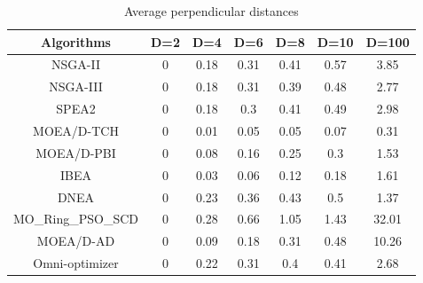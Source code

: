 \documentclass[conference]{IEEEtran}
\begin{document}
\begin{table}[htbp]
\centering
\caption{Average perpendicular distances}
\begin{tabular}{@{}ccccccc@{}}
\toprule
Algorithms         & D=2 & D=4                           & D=6                           & D=8                           & D=10                          & D=100                         \\ \midrule
NSGA-II            & 0  & 0.18                         & 0.31                         & 0.41                         & 0.57                         & 3.85                         \\
NSGA-III           & 0  & 0.18                         & 0.31                         & 0.39                         & 0.48                         & 2.77                         \\
SPEA2              & 0  & 0.18                         & 0.3                          & 0.41                         & 0.49                         & 2.98                         \\
MOEA/D-TCH         & 0  & \cellcolor[HTML]{F8FF00}0.01 & \cellcolor[HTML]{F8FF00}0.05 & \cellcolor[HTML]{F8FF00}0.05 & \cellcolor[HTML]{F8FF00}0.07 & \cellcolor[HTML]{F8FF00}0.31 \\
MOEA/D-PBI         & 0  & 0.08                         & 0.16                         & 0.25                         & 0.3                          & 1.53                         \\
IBEA               & 0  & 0.03                         & 0.06                         & 0.12                         & 0.18                         & 1.61                         \\
DNEA               & 0  & 0.23                         & 0.36                         & 0.43                         & 0.5                          & 1.37                         \\
MO\_Ring\_PSO\_SCD & 0  & 0.28                         & 0.66                         & 1.05                         & 1.43                         & 32.01                        \\
MOEA/D-AD          & 0  & 0.09                         & 0.18                         & 0.31                         & 0.48                         & 10.26                        \\
Omni-optimizer     & 0  & 0.22                         & 0.31                         & 0.4                          & 0.41                         & 2.68                         \\ \bottomrule
\end{tabular}
\label{table: Perpendicular Distance}
\end{table}
\end{document}
